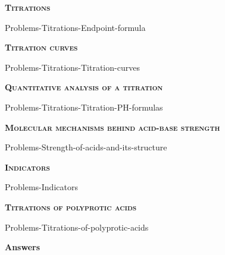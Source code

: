 \documentclass[main.tex]{subfiles}
\newcommand\chapterlabel{Ch-acidbase}
\begin{document}
\begin{multicols*}{2}
{\raggedright\textsc{\textbf{Titrations}}\par}
 {Problems-Titrations-Endpoint-formula}
 
 {\raggedright\textsc{\textbf{Titration curves}}\par}
 {Problems-Titrations-Titration-curves}
 
 
 {\raggedright\textsc{\textbf{Quantitative analysis of a titration}}\par}
 {Problems-Titrations-Titration-PH-formulas}%


 {\raggedright\textsc{\textbf{Molecular mechanisms behind acid-base strength}}\par}%
 {Problems-Strength-of-acids-and-its-structure}%

 {\raggedright\textsc{\textbf{Indicators}}\par}%
 {Problems-Indicators}%

{\raggedright\textsc{\textbf{Titrations of polyprotic acids}}\par}%
 {Problems-Titrations-of-polyprotic-acids}%

\end{multicols*}


\newpage \begin{answerbox}
\begin{answersenvironment}
 \begin{localsize}{10}
{\Large \bf Answers}
\printsolutions 
 \end{localsize}
 \end{answersenvironment}
\end{answerbox}
\end{document}
